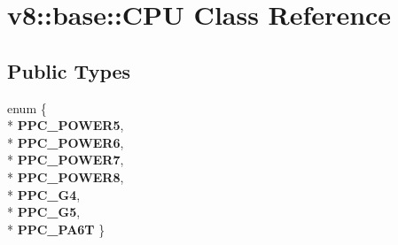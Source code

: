 \hypertarget{classv8_1_1base_1_1_c_p_u}{}\section{v8\+:\+:base\+:\+:C\+PU Class Reference}
\label{classv8_1_1base_1_1_c_p_u}
\subsection*{Public Types}
\begin{DoxyCompactItemize}
\item 
enum \{ \\*
{\bfseries P\+P\+C\+\_\+\+P\+O\+W\+E\+R5}, 
\\*
{\bfseries P\+P\+C\+\_\+\+P\+O\+W\+E\+R6}, 
\\*
{\bfseries P\+P\+C\+\_\+\+P\+O\+W\+E\+R7}, 
\\*
{\bfseries P\+P\+C\+\_\+\+P\+O\+W\+E\+R8}, 
\\*
{\bfseries P\+P\+C\+\_\+\+G4}, 
\\*
{\bfseries P\+P\+C\+\_\+\+G5}, 
\\*
{\bfseries P\+P\+C\+\_\+\+P\+A6T}
 \}\hypertarget{classv8_1_1base_1_1_c_p_u_a5f8c61905b58bf3febc84083b179b1a6}{}\label{classv8_1_1base_1_1_c_p_u_a5f8c61905b58bf3febc84083b179b1a6}

\end{DoxyCompactItemize}
